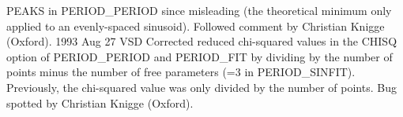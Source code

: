 \documentclass[twoside,11pt,noabs,nolof]{starlink}
\begin{document}
\begin{small}
\begin{terminalv}
                         PEAKS in PERIOD_PERIOD since misleading (the
                         theoretical minimum only applied to an
                         evenly-spaced sinusoid). Followed comment by
                         Christian Knigge (Oxford).
1993 Aug 27    VSD       Corrected reduced chi-squared values in the CHISQ
                         option of PERIOD_PERIOD and PERIOD_FIT by dividing
                         by the number of points minus the number of free
                         parameters (=3 in PERIOD_SINFIT). Previously, the
                         chi-squared value was only divided by the number
                         of points. Bug spotted by Christian Knigge (Oxford).
\end{terminalv}
\end{small}

\newpage
\end{document}
